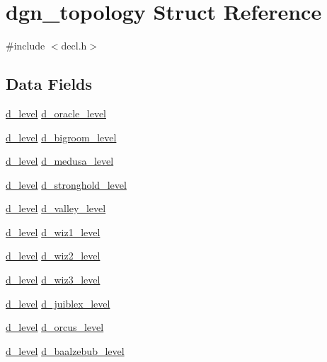 \hypertarget{structdgn__topology}{\section{dgn\+\_\+topology Struct Reference}
\label{structdgn__topology}
}


{\ttfamily \#include $<$decl.\+h$>$}

\subsection*{Data Fields}
\begin{DoxyCompactItemize}
\item 
\hyperlink{structd__level}{d\+\_\+level} \hyperlink{structdgn__topology_a0029004db8c1bdcd52d4d3c78609b80d}{d\+\_\+oracle\+\_\+level}
\item 
\hyperlink{structd__level}{d\+\_\+level} \hyperlink{structdgn__topology_a4a1651865b98a8a8884bfb419fd408fc}{d\+\_\+bigroom\+\_\+level}
\item 
\hyperlink{structd__level}{d\+\_\+level} \hyperlink{structdgn__topology_a37b09e94fef923ce9c14bdea391419ed}{d\+\_\+medusa\+\_\+level}
\item 
\hyperlink{structd__level}{d\+\_\+level} \hyperlink{structdgn__topology_a0bb650c2cd47240d4e303cd5bfdf6843}{d\+\_\+stronghold\+\_\+level}
\item 
\hyperlink{structd__level}{d\+\_\+level} \hyperlink{structdgn__topology_a39e2bbb872644673cb386ddc03f5a613}{d\+\_\+valley\+\_\+level}
\item 
\hyperlink{structd__level}{d\+\_\+level} \hyperlink{structdgn__topology_a6168834a03774c5910089630f8caeab4}{d\+\_\+wiz1\+\_\+level}
\item 
\hyperlink{structd__level}{d\+\_\+level} \hyperlink{structdgn__topology_af042505c7b918153ac9b36c6d41bc365}{d\+\_\+wiz2\+\_\+level}
\item 
\hyperlink{structd__level}{d\+\_\+level} \hyperlink{structdgn__topology_a2f1fcd278eba9b31a12814dd0cf7fb0e}{d\+\_\+wiz3\+\_\+level}
\item 
\hyperlink{structd__level}{d\+\_\+level} \hyperlink{structdgn__topology_a8f22a9d6ab6cabc967a001e30f7ad747}{d\+\_\+juiblex\+\_\+level}
\item 
\hyperlink{structd__level}{d\+\_\+level} \hyperlink{structdgn__topology_ad4d0f2bc6fa88103aa03fc5b4336457b}{d\+\_\+orcus\+\_\+level}
\item 
\hyperlink{structd__level}{d\+\_\+level} \hyperlink{structdgn__topology_a1cd535a31083cd1f46106388142bcc34}{d\+\_\+baalzebub\+\_\+level}

\end{DoxyCompactItemize}
